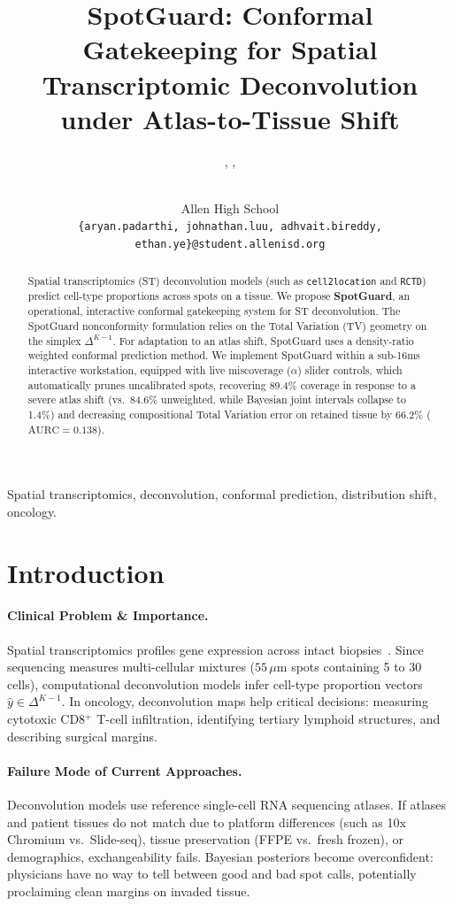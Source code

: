 \documentclass[pmlr,twocolumn,10pt]{jmlr}
\title[SpotGuard: Conformal Gatekeeping for Spatial Deconvolution]{SpotGuard: Conformal Gatekeeping for Spatial Transcriptomic Deconvolution under Atlas-to-Tissue Shift}
\author{%
 \Name{Aryan Padarthi},
 \Name{Johnathan Luu},
 \Name{Adhvait Reddy Bireddy}\and
 \Name{Ethan Mingyi Ye}\\
 \addr Allen High School\\
 \normalfont\small\texttt{\{aryan.padarthi, johnathan.luu, adhvait.bireddy, ethan.ye\}@student.allenisd.org}
}
\newcommand{\simplex}{\Delta^{K-1}}
\begin{document}
\maketitle

\begin{abstract}
Spatial transcriptomics (ST) deconvolution models (such as \texttt{cell2location} and \texttt{RCTD}) predict cell-type proportions across spots on a tissue. We propose \textbf{SpotGuard}, an operational, interactive conformal gatekeeping system for ST deconvolution. The SpotGuard nonconformity formulation relies on the Total Variation (TV) geometry on the simplex $\simplex$. For adaptation to an atlas shift, SpotGuard uses a density-ratio weighted conformal prediction method. We implement SpotGuard within a sub-16ms interactive workstation, equipped with live miscoverage ($\alpha$) slider controls, which automatically prunes uncalibrated spots, recovering 89.4\% coverage in response to a severe atlas shift (vs.\ 84.6\% unweighted, while Bayesian joint intervals collapse to 1.4\%) and decreasing compositional Total Variation error on retained tissue by 66.2\% ($\text{AURC} = 0.138$).
\end{abstract}

\begin{keywords}
Spatial transcriptomics, deconvolution, conformal prediction, distribution shift, oncology.
\end{keywords}

\section{Introduction}
\label{sec:intro}

\paragraph{Clinical Problem \& Importance.}
Spatial transcriptomics profiles gene expression across intact biopsies~\citep{marx2021method, rao2021exploring}. Since sequencing measures multi-cellular mixtures ($55\,\mu\text{m}$ spots containing 5 to 30 cells), computational deconvolution models infer cell-type proportion vectors $\hat{y} \in \simplex$. In oncology, deconvolution maps help critical decisions: measuring cytotoxic CD8$^+$ T-cell infiltration, identifying tertiary lymphoid structures, and describing surgical margins.

\paragraph{Failure Mode of Current Approaches.}
Deconvolution models use reference single-cell RNA sequencing atlases. If atlases and patient tissues do not match due to platform differences (such as 10x Chromium vs.\ Slide-seq), tissue preservation (FFPE vs.\ fresh frozen), or demographics, exchangeability fails. Bayesian posteriors become overconfident: physicians have no way to tell between good and bad spot calls, potentially proclaiming clean margins on invaded tissue.
\end{document}
